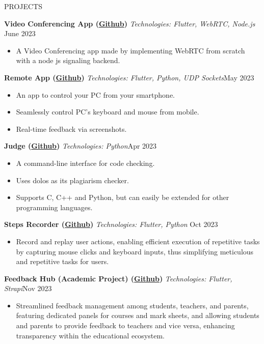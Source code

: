 \documentclass{resume} %
\begin{document}
\begin{rSection}{PROJECTS}

\textbf{Video Conferencing App (\href{https://github.com/ShivanshuKGupta/flutter-webrtc-app}{Github})} \textit{Technologies: Flutter, WebRTC, Node.js} \hfill June 2023 

 \begin{itemize}
    \itemsep -3pt {} 
     \item A Video Conferencing app made by implementing WebRTC from scratch with a node js signaling backend.
 \end{itemize}

\textbf{Remote App (\href{https://github.com/ShivanshuKGupta/remote}{Github})} \textit{Technologies: Flutter, Python, UDP Sockets}\hfill May 2023

 \begin{itemize}
    \itemsep -3pt {} 
     \item An app to control your PC from your smartphone.
\item Seamlessly control PC's keyboard and mouse from mobile.
\item Real-time feedback via screenshots.

 \end{itemize}

\textbf{Judge (\href{https://github.com/ShivanshuKGupta/Judge}{Github})} \textit{Technologies: Python}\hfill Apr 2023

 \begin{itemize}
    \itemsep -3pt {} 
     \item A command-line interface for code checking.
\item Uses dolos as its plagiarism checker.
\item Supports C, C++ and Python, but can easily be extended for other programming languages.

 \end{itemize}

\textbf{Steps Recorder (\href{https://github.com/ShivanshuKGupta/Steps-Recorder}{Github})} \textit{Technologies: Flutter, Python} \hfill Oct 2023
 \begin{itemize}
    \itemsep -3pt {} 
     \item Record and replay user actions, enabling efficient execution of repetitive tasks by capturing mouse clicks and keyboard inputs, thus simplifying meticulous and repetitive tasks for users.
 \end{itemize}

\textbf{Feedback Hub (Academic Project) (\href{https://github.com/ShivanshuKGupta/feedback_hub}{Github})} \textit{Technologies: Flutter, Strapi}\hfill Nov 2023
 \begin{itemize}
    \itemsep -3pt {} 
     \item Streamlined feedback management among students, teachers, and parents, featuring dedicated panels for courses and mark sheets, and allowing students and parents to provide feedback to teachers and vice versa, enhancing transparency within the educational ecosystem.
 \end{itemize}


\end{rSection}
\end{document}
